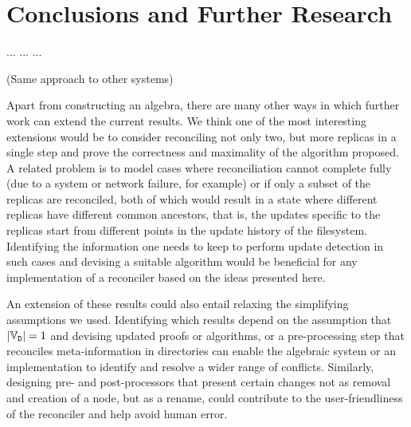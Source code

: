 
\section{Conclusions and Further Research}

... ... ...

(Same approach to other systems)
\medskip


Apart from constructing an algebra,
there are many other ways in which further work can extend the current results.
We think one of the most interesting extensions would be to
consider reconciling not only two, but more replicas in a single step and
prove the correctness and maximality of the algorithm proposed.
A related problem is to model cases where reconciliation cannot
complete fully (due to a system or network failure, for example)
or if only a subset of the replicas are reconciled,
both of which would result in a state where different replicas
have different common ancestors, that is,
the updates specific to the replicas start from different points
in the update history of the filesystem.
Identifying the information one needs to keep to perform
update detection in such cases and devising a suitable algorithm
would be beneficial for any implementation of a reconciler
based on the ideas presented here.

An extension of these results could also entail relaxing
the simplifying assumptions we used.
Identifying which results depend on the assumption that $|\mathbb{V}_{\mathtt{D}}|=1$
and devising updated proofs or algorithms,
or a pre-processing step that reconciles meta-information in directories
can enable the algebraic system or an implementation
to identify and resolve a wider range of conflicts.
Similarly, designing pre- and post-processors that
present certain changes not as removal and creation of a node,
but as a rename,
could contribute to the user-friendliness of the reconciler
and help avoid human error.
